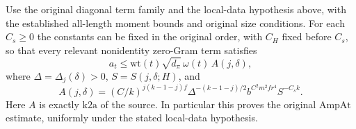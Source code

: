 \begin{theorem}
\label{thm:flag-global-amplitude}
Use the original diagonal term family and the local-data hypothesis
above, with the established all-length moment bounds and original
size conditions. For each \(C_s\ge0\) the constants can be fixed in
the original order, with \(C_H\) fixed before \(C_s\), so that every
relevant nonidentity zero-Gram term satisfies
\[
 a_t\le \mathrm{wt}(t)\sqrt{d_\pi}\,\omega(t)\,
           A(j,\delta),
 \tag{GA1}
\]
where \(\Delta=\Delta_j(\delta)>0\), \(S=S(j,\delta;H)\), and
\[
 A(j,\delta)=
  (C/k)^{j(k-1-j)f}
  \Delta^{-(k-1-j)/2}
  b^{C^2m^2fr^4} S^{-C_s k}.
 \tag{GA2}
\]
Here \(A\) is exactly \(\mathrm{k2a}\) of the source. In particular
this proves the original \(\mathrm{AmpAt}\) estimate, uniformly
under the stated local-data hypothesis.
\end{theorem}
